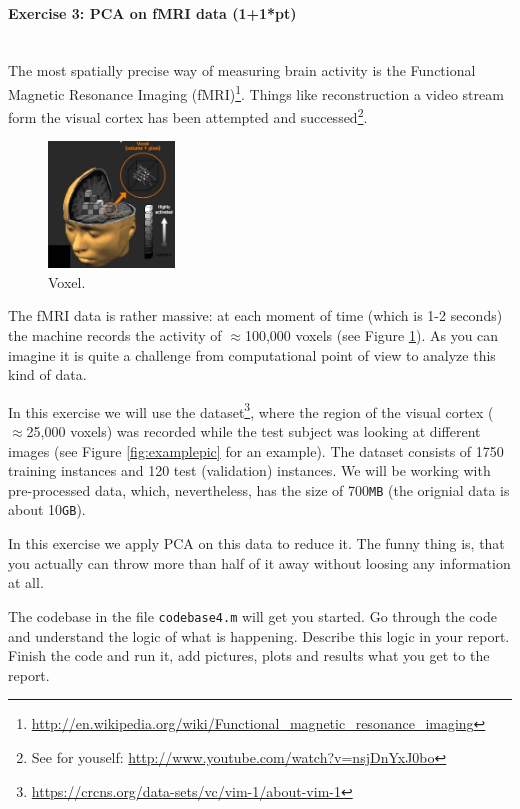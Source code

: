 \documentclass[a4paper,11pt]{article}
\newenvironment{exercise}[3]{\paragraph{Exercise #1: #2 (#3pt)}\ \\}{
\medskip}
\begin{document}
%
%
\begin{exercise}{3}{PCA on fMRI data}{1+1*}
The most spatially precise way of measuring brain activity is the Functional Magnetic Resonance Imaging (fMRI)\footnote{\url{http://en.wikipedia.org/wiki/Functional_magnetic_resonance_imaging}}. Things like reconstruction a video stream form the visual cortex has been attempted and successed\footnote{See for youself: \url{http://www.youtube.com/watch?v=nsjDnYxJ0bo}}.

\begin{figure}
	\centering
	\vspace{-12pt}
	\includegraphics[width=0.3\textwidth]{voxel.jpg}
	\caption{Voxel.}
	\label{fig:voxel}
	\vspace{-10pt}
\end{figure}
The fMRI data is rather massive: at each moment of time (which is 1-2 seconds) the machine records the activity of $\approx$100,000 voxels (see Figure \ref{fig:voxel}). As you can imagine it is quite a challenge from computational point of view to analyze this kind of data.

In this exercise we will use the dataset\footnote{\url{https://crcns.org/data-sets/vc/vim-1/about-vim-1}}, where the region of the visual cortex ($\approx$25,000 voxels) was recorded while the test subject was looking at different images (see Figure \ref{fig:examplepic} for an example). The dataset consists of 1750 training instances and 120 test (validation) instances. We will be working with pre-processed data, which, nevertheless, has the size of 700\texttt{MB} (the orignial data is about 10\texttt{GB}).

In this exercise we apply PCA on this data to reduce it. The funny thing is, that you actually can throw more than half of it away without loosing any information at all.

The codebase in the file \texttt{codebase4.m} will get you started. Go through the code and understand the logic of what is happening. Describe this logic in your report. Finish the code and run it, add pictures, plots and results what you get to the report.


\end{exercise}
\end{document}
